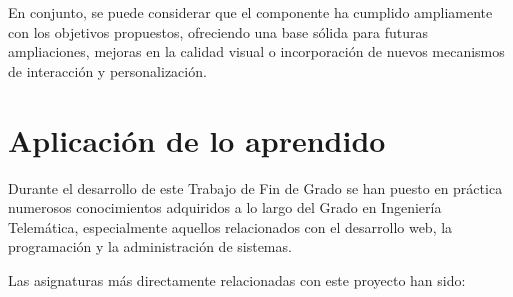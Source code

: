 \documentclass[a4paper, 12pt]{book}
\begin{document}
En conjunto, se puede considerar que el componente ha cumplido ampliamente con los objetivos propuestos, ofreciendo una base sólida para futuras ampliaciones, mejoras en la calidad visual o incorporación de nuevos mecanismos de interacción y personalización.

\section{Aplicación de lo aprendido}
\label{sec:aplicacion}



Durante el desarrollo de este Trabajo de Fin de Grado se han puesto en práctica numerosos conocimientos adquiridos a lo largo del Grado en Ingeniería Telemática, especialmente aquellos relacionados con el desarrollo web, la programación y la administración de sistemas.

Las asignaturas más directamente relacionadas con este proyecto han sido:
\end{document}
